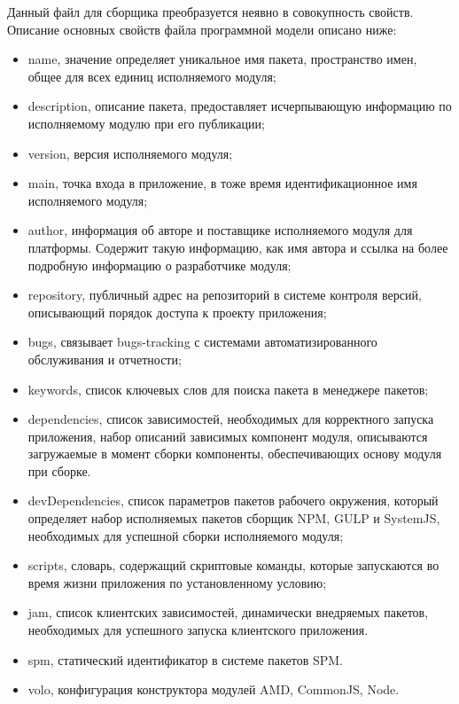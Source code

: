 Данный файл для сборщика \npm{} преобразуется неявно в совокупность свойств. Описание основных свойств файла программной модели описано ниже:
\begin{itemize}
  \item name, значение определяет уникальное имя пакета, пространство имен, общее для всех единиц исполняемого модуля;
  \item description, описание пакета, предоставляет исчерпывающую информацию по исполняемому модулю при его публикации;
  \item version, версия исполняемого модуля;
  \item main, точка входа в приложение, в тоже время идентификационное имя исполняемого модуля;
  \item author, информация об авторе и поставщике исполняемого модуля для платформы. Содержит такую информацию, как имя автора и ссылка на более подробную информацию о разработчике модуля;
  \item repository, публичный адрес на репозиторий в системе контроля версий,
  описывающий порядок доступа к проекту приложения;
  \item bugs, связывает bugs-tracking с системами автоматизированного обслуживания и отчетности;
  \item keywords, список ключевых слов для поиска пакета в менеджере пакетов;
  \item dependencies, список зависимостей, необходимых для корректного запуска приложения, набор описаний зависимых компонент модуля, описываются загружаемые в момент сборки компоненты, обеспечивающих основу модуля при сборке.
  \item devDependencies, список параметров пакетов рабочего окружения, который определяет набор исполняемых пакетов сборщик NPM, GULP и SystemJS, необходимых для успешной сборки исполняемого модуля;
  \item scripts, словарь, содержащий скриптовые команды, которые запускаются во время жизни приложения по установленному условию;
  \item jam, список клиентских зависимостей, динамически внедряемых пакетов, необходимых для успешного запуска клиентского приложения.
  \item spm, статический идентификатор в системе пакетов SPM.
  \item volo, конфигурация конструктора модулей  AMD, CommonJS, Node.
\end{itemize}


